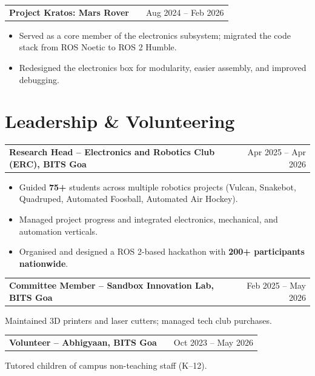 \documentclass[a4paper,12pt]{article}
\makeatletter
\newenvironment{jobshort}[2]
    {\begin{tabularx}{\linewidth}{@{}l X r@{}} \textbf{#1} & \hfill &  #2 \\[3.75pt] \end{tabularx}}
    {}
\newenvironment{joblong}[2]
    {\begin{tabularx}{\linewidth}{@{}l X r@{}} \textbf{#1} & \hfill &  #2 \\[3.75pt] \end{tabularx}
    \begin{minipage}[t]{\linewidth}\raggedright
    \begin{itemize}[nosep,after=\strut, leftmargin=1em, itemsep=3pt,label=--]}
    {\end{itemize} \end{minipage}}
\makeatother
\begin{document}
\begin{joblong}{Project Kratos: Mars Rover \href{https://github.com/KevinBMathew/irc2025}{\raisebox{-0.05\height}\faGithub}}{Aug 2024 -- Feb 2026}
\item Served as a core member of the electronics subsystem; migrated the code stack from ROS Noetic to ROS 2 Humble.
\item Redesigned the electronics box for modularity, easier assembly, and improved debugging.
\end{joblong}

\pagebreak
\section{Leadership \& Volunteering}
\begin{jobshort}{Research Head -- Electronics and Robotics Club (ERC), BITS Goa}{Apr 2025 -- Apr 2026}
\begin{itemize} [label={-}]
\raggedright
\item Guided \textbf{75+} students across multiple robotics projects (Vulcan, Snakebot, Quadruped, Automated Foosball, Automated Air Hockey).
\item Managed project progress and integrated electronics, mechanical, and automation verticals.
\item Organised and designed a ROS 2-based hackathon with \textbf{200+ participants nationwide}.
\end{itemize}
\end{jobshort}

\begin{jobshort}{Committee Member -- Sandbox Innovation Lab, BITS Goa}{Feb 2025 -- May 2026}
Maintained 3D printers and laser cutters; managed tech club purchases.
\end{jobshort}

\begin{jobshort}{Volunteer -- Abhigyaan, BITS Goa}{Oct 2023 -- May 2026}
Tutored children of campus non-teaching staff (K--12).
\end{jobshort}
\end{document}
